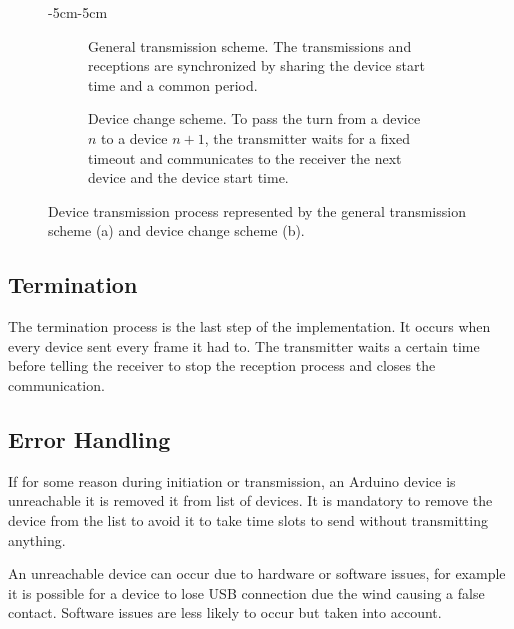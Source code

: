 \documentclass[a4paper, 12pt]{article}
\begin{document}
\begin{figure}[ht]
  \begin{adjustwidth}{-5cm}{-5cm}
  \centering
  \begin{subfigure}[ht]{0.7\textwidth}
    
    \caption{General transmission scheme. The transmissions and receptions are synchronized by sharing the device start time and a common period.}
    \label{fig:generalTransmission}
  \end{subfigure}
  \begin{subfigure}[ht]{0.7\textwidth}

    
    \caption{Device change scheme. To pass the turn from a device $n$ to a device $n+1$, the transmitter waits for a fixed timeout and communicates to the receiver the next device and the device start time.}
    \label{fig:deviceChange}
  \end{subfigure}

  \end{adjustwidth}
  \caption{Device transmission process represented by the general transmission scheme (a) and device change scheme (b).}
  \label{fig:transmissionProcess}
\end{figure}


\subsection{Termination}\label{impl:termination}
The termination process is the last step of the implementation.
It occurs when every device sent every frame it had to. The transmitter waits a certain time before telling the receiver to stop the reception process and closes the communication.

\subsection{Error Handling}\label{impl:errorHandling}
If for some reason during initiation or transmission, an Arduino device is unreachable it is removed it from list of devices. It is mandatory to remove the device from the list to avoid it to take time slots to send without transmitting anything. 

An unreachable device can occur due to hardware or software issues, for example it is possible for a device to lose USB connection due the wind causing a false contact. Software issues are less likely to occur but taken into account. 
\end{document}
